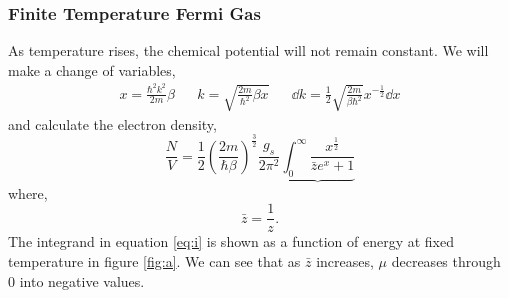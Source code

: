 \documentclass{book}
\begin{document}
\subsubsection{Finite Temperature Fermi Gas}
As temperature rises, the chemical potential will not remain constant. We will make a change of variables,
\begin{align}
	x = \frac{\hbar^2k^2}{2m}\beta && k=\sqrt{\frac{2m}{\hbar^2}\beta x} && \dd{k} = \frac{1}{2}\sqrt{\frac{2m}{\beta\hbar^2}}x^{-\frac{1}{2}}\dd{x}
\end{align}
and calculate the electron density,
\begin{equation}
	\frac{N}{V} = \frac{1}{2} \left(\frac{2m}{\hbar\beta}\right)^{\frac{3}{2}}\frac{g_s}{2\pi^2}\underbrace{\int_0^{\infty}\frac{x^{\frac{1}{2}}}{\bar{z}e^{x} + 1}} \label{eq:i}
	\end{equation}
where,
\begin{equation}
	\bar{z} = \frac{1}{z}.
\end{equation}
The integrand in equation \eqref{eq:i} is shown as a function of energy at fixed temperature in figure \ref{fig:a}. We can see that as $\bar{z}$ increases, $\mu$ decreases through 0 into negative values. 
\end{document}
